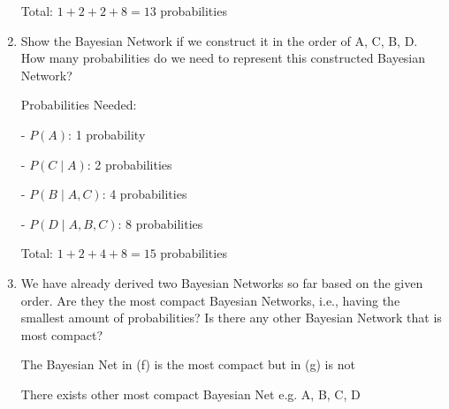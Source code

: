 \documentclass[12pt]{article}
\begin{document}
\begin{enumerate}[font=\Large,label=(\alph*)]
	      Total: $ 1 + 2 + 2 + 8 = 13 $ probabilities

	\item Show the Bayesian Network if we construct it in the order of A, C, B, D. How many probabilities do we need to represent this constructed Bayesian Network?
	      \begin{center}
	      \end{center}

	      Probabilities Needed:

	      - $ P(A) $: 1 probability

	      - $ P(C \mid A) $: 2 probabilities

	      - $ P(B \mid A, C) $: 4 probabilities

	      - $ P(D \mid A, B, C) $: 8 probabilities

	      Total: $ 1 + 2 + 4 + 8 = 15 $ probabilities

	\item We have already derived two Bayesian Networks so far based on the given order. Are they the most compact Bayesian Networks, i.e., having the smallest amount of probabilities? Is there any other Bayesian Network that is most compact?

	      The Bayesian Net in (f) is the most compact but in (g) is not

	      There exists other most compact Bayesian Net e.g. A, B, C, D
\end{enumerate}

\newpage
\end{document}
